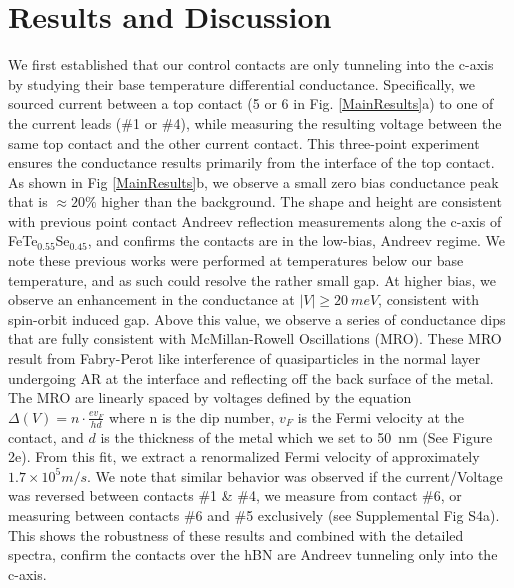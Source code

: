 \section{Results and Discussion}
We first established that our control contacts are only tunneling into the c-axis by studying their base temperature differential conductance. Specifically, we sourced current between a top contact (5 or 6 in Fig. \ref{MainResults}a) to one of the current leads (\#1 or \#4), while measuring the resulting voltage between the same top contact and the other current contact. This three-point experiment ensures the conductance results primarily from the interface of the top contact. As shown in Fig \ref{MainResults}b, we observe a small zero bias conductance peak that is $\approx 20 \%$ higher than the background. The shape and height are consistent with previous point contact Andreev reflection measurements along the c-axis of FeTe$_{0.55}$Se$_{0.45}$,\cite{Daghero2014} and confirms the contacts are in the low-bias, Andreev regime. We note these previous works were performed at temperatures below our base temperature, and as such could resolve the rather small gap. At higher bias, we observe an enhancement in the conductance  at $|V|\geq 20~meV$, consistent with spin-orbit induced gap. Above this value, we observe a series of conductance dips that are fully consistent with McMillan-Rowell Oscillations (MRO)\cite{2004PhyC..408..618C,2004PhRvB..69m2507S}. These MRO result from Fabry-Perot like interference of quasiparticles in the normal layer undergoing AR at the interface and reflecting off the back surface of the metal. The MRO are linearly spaced by voltages\cite{2004PhyC..408..618C} defined by the equation $\Delta(V) = n\cdot\frac{ev_{F}}{hd}$ where n is the dip number, $v_{F}$ is the Fermi velocity at the contact, and $d$ is the thickness of the metal which we set to 50~nm (See Figure 2e). From this fit, we extract a renormalized Fermi velocity of approximately $1.7\times10^5 m/s$.  We note that similar behavior was observed if the current/Voltage was reversed between contacts \#1 \& \#4, we measure from contact \#6, or measuring between contacts \#6 and \#5 exclusively (see Supplemental Fig S4a). This shows the robustness of these results and combined with the detailed spectra, confirm the contacts over the hBN are Andreev tunneling only into the c-axis. 

